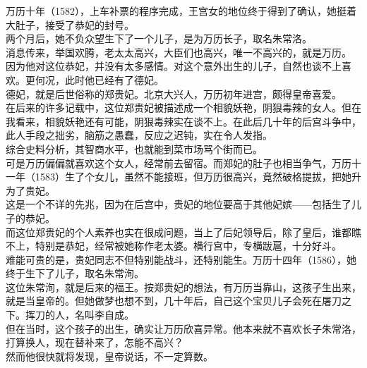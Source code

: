 	\begin{multicols}{\theparacolNo}
\fi
万历十年（1582），上车补票的程序完成，王宫女的地位终于得到了确认，她挺着大肚子，接受了恭妃的封号。\\

两个月后，她不负众望生下了一个儿子，是为万历长子，取名朱常洛。\\

消息传来，举国欢腾，老太太高兴，大臣们也高兴，唯一不高兴的，就是万历。\\

因为他对这位恭妃，并没有太多感情。对这个意外出生的儿子，自然也谈不上喜欢。更何况，此时他已经有了德妃。\\

德妃，就是后世俗称的郑贵妃。北京大兴人，万历初年进宫，颇得皇帝喜爱。\\

在后来的许多记载中，这位郑贵妃被描述成一个相貌妖艳，阴狠毒辣的女人。但在我看来，相貌妖艳还有可能，阴狠毒辣实在谈不上。在此后几十年的后宫斗争中，此人手段之拙劣，脑筋之愚蠢，反应之迟钝，实在令人发指。\\

综合史料分析，其智商水平，也就能到菜市场骂个街而已。\\

可是万历偏偏就喜欢这个女人，经常前去留宿。而郑妃的肚子也相当争气，万历十一年（1583）生了个女儿，虽然不能接班，但万历很高兴，竟然破格提拔，把她升为了贵妃。\\

这是一个不详的先兆，因为在后宫中，贵妃的地位要高于其他妃嫔——包括生了儿子的恭妃。\\

而这位郑贵妃的个人素养也实在很成问题，当上了后妃领导后，除了皇后，谁都瞧不上，特别是恭妃，经常被她称作老太婆。横行宫中，专横跋扈，十分好斗。\\

难能可贵的是，贵妃同志不但特别能战斗，还特别能生。万历十四年（1586），她终于生下了儿子，取名朱常洵。\\

这位朱常洵，就是后来的福王。按郑贵妃的想法，有万历当靠山，这孩子生出来，就是当皇帝的。但她做梦也想不到，几十年后，自己这个宝贝儿子会死在屠刀之下。挥刀的人，名叫李自成。\\

但在当时，这个孩子的出生，确实让万历欣喜异常。他本来就不喜欢长子朱常洛，打算换人，现在替补来了，怎能不高兴？\\

然而他很快就将发现，皇帝说话，不一定算数。\\


\end{multicols}
